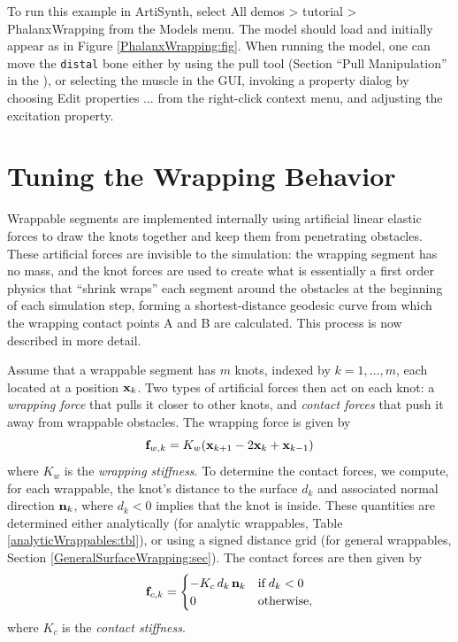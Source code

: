 To run this example in ArtiSynth, select {\sf All demos > tutorial >
PhalanxWrapping} from the {\sf Models} menu. The model should load and
initially appear as in Figure \ref{PhalanxWrapping:fig}.  When running
the model, one can move the {\tt distal} bone either
by using the pull tool (Section ``Pull
Manipulation'' in the
),
or selecting the muscle in the GUI, invoking a property dialog by
choosing {\sf Edit properties ...} from the right-click context menu,
and adjusting the {\sf excitation} property.

\section{Tuning the Wrapping Behavior}
\label{wrapTuning:sec}

Wrappable segments are implemented internally using artificial linear
elastic forces to draw the knots together and keep them from
penetrating obstacles. These artificial forces are invisible to the
simulation: the wrapping segment has no mass, and the knot forces are
used to create what is essentially a first order physics that ``shrink
wraps'' each segment around the obstacles at the beginning of each
simulation step, forming a shortest-distance geodesic curve from
which the wrapping contact points A and B are calculated. This process
is now described in more detail.

Assume that a wrappable segment has $m$ knots, indexed by $k =
1, \ldots, m$, each located at a position ${\bf x}_k$. Two types of
artificial forces then act on each knot: a {\it wrapping force}
that pulls it closer to other knots, and {\it contact forces} that
push it away from wrappable obstacles. The wrapping force is given by
%
\begin{equation*}
{\bf f}_{w,k} = K_w ({\bf x}_{k+1} - 2 {\bf x}_k + {\bf x}_{k-1})
\end{equation*}
%
where $K_w$ is the {\it wrapping stiffness}. To determine the contact
forces, we compute, for each wrappable, the knot's distance to the
surface $d_k$ and associated normal direction ${\bf n}_k$, where $d_k < 0$
implies that the knot is inside. These quantities are determined
either analytically (for analytic wrappables, Table
\ref{analyticWrappables:tbl}), or using a signed distance grid (for
general wrappables, Section \ref{GeneralSurfaceWrapping:sec}).  The
contact forces are then given by
%
\begin{equation*}
{\bf f}_{c,k} = 
\begin{cases}
-K_c \, d_k \, {\bf n}_k & \text{if} \; d_k < 0 \\
0 & \text{otherwise},
\end{cases}
\end{equation*}
%
where $K_c$ is the {\it contact stiffness}.

